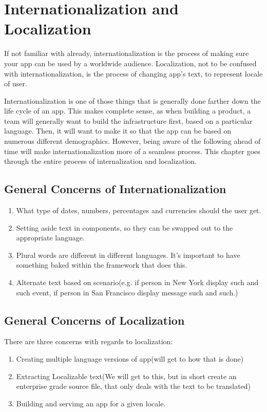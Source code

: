 \chapter{ Internationalization and Localization}

If not familiar with already, internationalization is the process of making sure
your app can be used by a worldwide audience. Localization, not to be confused 
with internationalization, is the process of changing app's text, to represent 
locale of user.

Internationalization is one of those things that is generally done farther down
the life cycle of an app. This makes complete sense, as when building a product, 
a team will generally want to build the infrastructure first, based on a 
particular language. Then, it will want to make it so that the app can be based 
on numerous different demographics. However, being aware of the following ahead 
of time will make internationalization more of a seamless process. This chapter 
goes through the entire process of internalization and localization.

\section{General Concerns of Internationalization }

\begin{enumerate}
  \item What type of dates, numbers, percentages and currencies should the user
  get.
  \item Setting aside text in components, so they can be swapped out to the 
  appropriate language. 
  \item Plural words are different in different languages. It's important 
  to have something baked within the framework that does this. 
  \item Alternate text based on scenario(e.g. if person in New York display 
  such and such event, if person in San Francisco display message such and 
  such.)
\end{enumerate}

\section{General Concerns of Localization }
There are three concerns with regards to localization: 
\begin{enumerate}
  \item Creating multiple language versions of app(will get to how that is done)
  \item Extracting Localizable text(We will get to this, but in short create 
  an enterprise grade source file, that only deals with the text to be
  translated)
  \item Building and servimg an app for a given locale. 
\end{enumerate}


